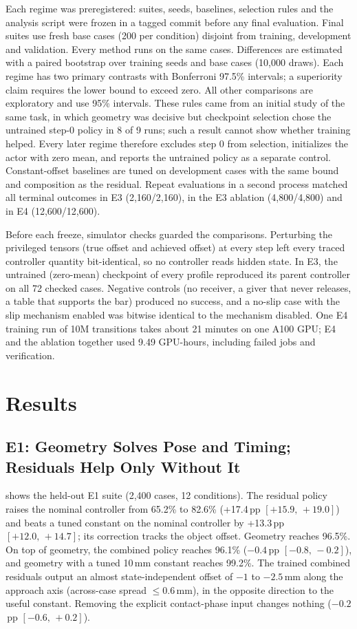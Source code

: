 \documentclass[conference,letterpaper]{IEEEtran}
\newcommand{\pp}{\,pp}
\newcommand{\ci}[2]{\mbox{$[#1,\,#2]$}}
\begin{document}
Each regime was preregistered: suites, seeds, baselines, selection rules and the analysis script were frozen in a
tagged commit before any final evaluation. Final suites use fresh base cases (200 per condition) disjoint from
training, development and validation. Every method runs on the same cases. Differences are estimated with a paired
bootstrap over training seeds and base cases (10,000 draws). Each regime has two primary contrasts with Bonferroni
97.5\% intervals; a superiority claim requires the lower bound to exceed zero. All other comparisons are exploratory
and use 95\% intervals. These rules came from an initial study of the same task, in which geometry was decisive
but checkpoint selection chose the untrained step-0 policy in 8 of 9 runs; such a result cannot show whether training
helped. Every later regime therefore excludes step 0 from selection, initializes the actor with zero mean, and
reports the untrained policy as a separate control. Constant-offset baselines are tuned on development cases with the same bound and
composition as the residual. Repeat evaluations in a second process matched all terminal outcomes in E3 (2,160/2,160), in the E3
ablation (4,800/4,800) and in E4 (12,600/12,600).

Before each freeze, simulator checks guarded the comparisons. Perturbing the privileged tensors (true offset and
achieved offset) at every step left every traced controller quantity bit-identical, so no controller reads hidden
state. In E3, the untrained (zero-mean) checkpoint of every profile reproduced its parent controller on all 72 checked
cases.
Negative controls (no receiver, a giver that never releases, a table that supports the bar) produced no success, and
a no-slip case with the slip mechanism enabled was bitwise identical to the mechanism disabled. One E4 training run
of 10M transitions takes about 21 minutes on one A100 GPU; E4 and the ablation together used 9.49 GPU-hours,
including failed jobs and verification.

\section{Results}

\subsection{E1: Geometry Solves Pose and Timing; Residuals Help Only Without It}

 shows the held-out E1 suite (2,400 cases, 12 conditions). The residual policy raises the nominal
controller from 65.2\% to 82.6\% (+17.4\pp{} \ci{+15.9}{+19.0}) and beats a tuned constant on the nominal controller
by +13.3\pp{} \ci{+12.0}{+14.7}; its correction tracks the object offset. Geometry reaches 96.5\%. On top of geometry,
the combined policy reaches 96.1\% ($-0.4$\pp{} \ci{-0.8}{-0.2}), and geometry with a tuned 10\,mm constant reaches
99.2\%. The trained combined residuals output an almost state-independent offset of $-1$ to $-2.5$\,mm along the
approach axis (across-case spread $\le 0.6$\,mm), in the opposite direction to the useful constant. Removing the
explicit contact-phase input changes nothing ($-0.2$\pp{} \ci{-0.6}{+0.2}).
\end{document}
